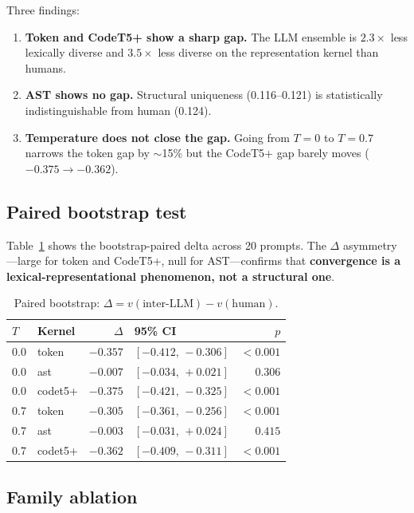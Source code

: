 \documentclass{article}
\begin{document}
Three findings:
\begin{enumerate}[leftmargin=*]
  \item \textbf{Token and CodeT5+ show a sharp gap.} The LLM ensemble is
    $2.3\times$ less lexically diverse and $3.5\times$ less diverse on
    the representation kernel than humans.
  \item \textbf{AST shows no gap.} Structural uniqueness (0.116--0.121) is
    statistically indistinguishable from human (0.124).
  \item \textbf{Temperature does not close the gap.} Going from $T{=}0$ to
    $T{=}0.7$ narrows the token gap by $\sim$15\% but the CodeT5+ gap
    barely moves ($-0.375\to-0.362$).
\end{enumerate}

\subsection{Paired bootstrap test}

Table~\ref{tab:pillar2} shows the bootstrap-paired delta across 20 prompts.
The $\Delta$ asymmetry---large for token and CodeT5+, null for
AST---confirms that \textbf{convergence is a lexical-representational
phenomenon, not a structural one}.

\begin{table}[h]
\centering\small
\begin{tabular}{llrlr}
\toprule
$T$ & Kernel & $\Delta$ & 95\% CI & $p$ \\
\midrule
0.0 & token   & $-0.357$ & $[-0.412,\,-0.306]$ & $<0.001$ \\
0.0 & ast     & $-0.007$ & $[-0.034,\,+0.021]$ & $0.306$ \\
0.0 & codet5+ & $-0.375$ & $[-0.421,\,-0.325]$ & $<0.001$ \\
0.7 & token   & $-0.305$ & $[-0.361,\,-0.256]$ & $<0.001$ \\
0.7 & ast     & $-0.003$ & $[-0.031,\,+0.024]$ & $0.415$ \\
0.7 & codet5+ & $-0.362$ & $[-0.409,\,-0.311]$ & $<0.001$ \\
\bottomrule
\end{tabular}
\caption{Paired bootstrap: $\Delta = v(\text{inter-LLM}) - v(\text{human})$.}
\label{tab:pillar2}
\end{table}

\subsection{Family ablation}
\end{document}
